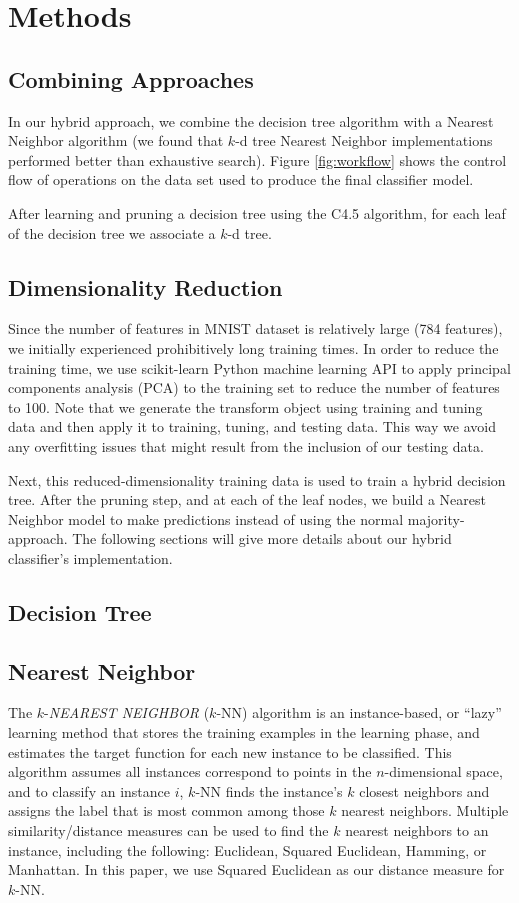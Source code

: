 \section{Methods}
\subsection{Combining Approaches}
In our hybrid approach, we combine the decision tree algorithm with a Nearest Neighbor algorithm (we found that $k$-d tree Nearest Neighbor implementations performed better than exhaustive search). Figure \ref{fig:workflow} shows the control flow of operations on the data set used to produce the final classifier model.

After learning and pruning a decision tree using the C4.5 algorithm, for each leaf of the decision tree we associate a $k$-d tree.

\subsection{Dimensionality Reduction}
Since the number of features in MNIST dataset is relatively large (784 features), we initially experienced prohibitively long training times. In order to reduce the training time, we use scikit-learn Python machine learning API to apply principal components analysis (PCA) to the training set to reduce the number of features to 100. Note that we generate the transform object using training and tuning data and then apply it to training, tuning, and testing data.  This way we avoid any overfitting issues that might result from the inclusion of our testing data.

Next, this reduced-dimensionality training data is used to train a hybrid decision tree. After the pruning step, and at each of the leaf nodes, we build a Nearest Neighbor model to make predictions instead of using the normal majority-approach. The following sections will give more details about our hybrid classifier's implementation.

\subsection{Decision Tree}

\subsection{Nearest Neighbor}
The $k$-\textit{NEAREST NEIGHBOR} ($k$-NN) algorithm is an instance-based, or ``lazy'' learning method that stores the training examples in the learning phase, and estimates the target function for each new instance to be classified. This algorithm assumes all instances correspond to points in the $n$-dimensional space, and to classify an instance $i$, $k$-NN finds the instance's $k$ closest neighbors and assigns the label that is most common among those $k$ nearest neighbors. Multiple similarity/distance measures can be used to find the $k$ nearest neighbors to an instance, including the following: Euclidean, Squared Euclidean, Hamming, or Manhattan. In this paper, we use Squared Euclidean as our distance measure for $k$-NN.

